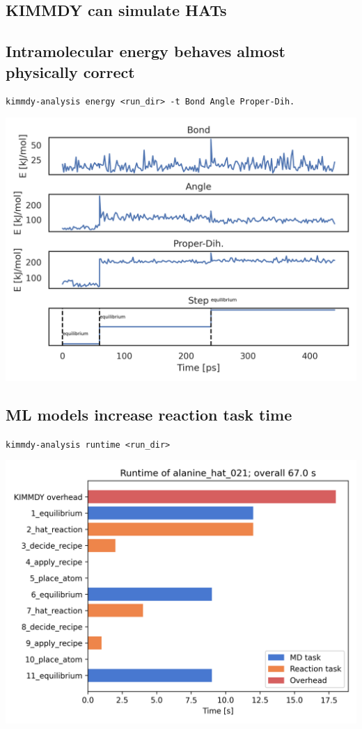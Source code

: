 \documentclass[
  letterpaper,
  DIV=11,
  numbers=noendperiod]{scrartcl}
\begin{document}
\hypertarget{kimmdy-can-simulate-hats}{%
\subsection{KIMMDY can simulate HATs}\label{kimmdy-can-simulate-hats}}

\hypertarget{intramolecular-energy-behaves-almost-physically-correct}{%
\subsection{Intramolecular energy behaves almost physically
correct}\label{intramolecular-energy-behaves-almost-physically-correct}}

\texttt{kimmdy-analysis\ energy\ \textless{}run\_dir\textgreater{}\ -t\ Bond\ Angle\ Proper-Dih.}

\includegraphics{www/ala_bonded.png}

\hypertarget{ml-models-increase-reaction-task-time}{%
\subsection{ML models increase reaction task
time}\label{ml-models-increase-reaction-task-time}}

\texttt{kimmdy-analysis\ runtime\ \textless{}run\_dir\textgreater{}}

\includegraphics{www/ala_runtime.png}
\end{document}
